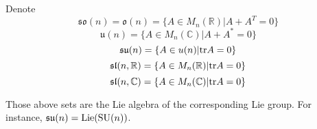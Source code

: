 Denote  \[\mathfrak{so}(n)=\mathfrak{o}(n)=\{A\in M_n(\mathbb{R})|A+A^T=0\} \]
\[\mathfrak{u}(n)=\{A\in M_n(\mathbb{C})|A+A^*=0\}\]
\[\mathfrak{su}(n)=\{A\in u(n)|\mathrm{tr} A=0\}\]
\[\mathfrak{sl}(n,\mathbb{R})=\{A\in M_n(\mathbb{R})|\mathrm{tr} A=0\}\]
\[\mathfrak{sl}(n,\mathbb{C})=\{A\in M_n(\mathbb{C})|\mathrm{tr} A=0\}\]
\begin{theorem}
    Those above sets are the Lie algebra of the corresponding Lie group. For instance,  $ \mathfrak{su}(n)=\mathrm{Lie}(\mathrm{SU}(n)) $. 
\end{theorem}